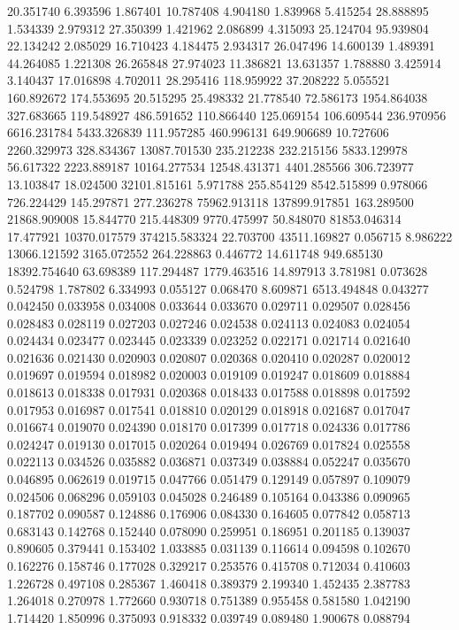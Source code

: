 20.351740
6.393596
1.867401
10.787408
4.904180
1.839968
5.415254
28.888895
1.534339
2.979312
27.350399
1.421962
2.086899
4.315093
25.124704
95.939804
22.134242
2.085029
16.710423
4.184475
2.934317
26.047496
14.600139
1.489391
44.264085
1.221308
26.265848
27.974023
11.386821
13.631357
1.788880
3.425914
3.140437
17.016898
4.702011
28.295416
118.959922
37.208222
5.055521
160.892672
174.553695
20.515295
25.498332
21.778540
72.586173
1954.864038
327.683665
119.548927
486.591652
110.866440
125.069154
106.609544
236.970956
6616.231784
5433.326839
111.957285
460.996131
649.906689
10.727606
2260.329973
328.834367
13087.701530
235.212238
232.215156
5833.129978
56.617322
2223.889187
10164.277534
12548.431371
4401.285566
306.723977
13.103847
18.024500
32101.815161
5.971788
255.854129
8542.515899
0.978066
726.224429
145.297871
277.236278
75962.913118
137899.917851
163.289500
21868.909008
15.844770
215.448309
9770.475997
50.848070
81853.046314
17.477921
10370.017579
374215.583324
22.703700
43511.169827
0.056715
8.986222
13066.121592
3165.072552
264.228863
0.446772
14.611748
949.685130
18392.754640
63.698389
117.294487
1779.463516
14.897913
3.781981
0.073628
0.524798
1.787802
6.334993
0.055127
0.068470
8.609871
6513.494848
0.043277
0.042450
0.033958
0.034008
0.033644
0.033670
0.029711
0.029507
0.028456
0.028483
0.028119
0.027203
0.027246
0.024538
0.024113
0.024083
0.024054
0.024434
0.023477
0.023445
0.023339
0.023252
0.022171
0.021714
0.021640
0.021636
0.021430
0.020903
0.020807
0.020368
0.020410
0.020287
0.020012
0.019697
0.019594
0.018982
0.020003
0.019109
0.019247
0.018609
0.018884
0.018613
0.018338
0.017931
0.020368
0.018433
0.017588
0.018898
0.017592
0.017953
0.016987
0.017541
0.018810
0.020129
0.018918
0.021687
0.017047
0.016674
0.019070
0.024390
0.018170
0.017399
0.017718
0.024336
0.017786
0.024247
0.019130
0.017015
0.020264
0.019494
0.026769
0.017824
0.025558
0.022113
0.034526
0.035882
0.036871
0.037349
0.038884
0.052247
0.035670
0.046895
0.062619
0.019715
0.047766
0.051479
0.129149
0.057897
0.109079
0.024506
0.068296
0.059103
0.045028
0.246489
0.105164
0.043386
0.090965
0.187702
0.090587
0.124886
0.176906
0.084330
0.164605
0.077842
0.058713
0.683143
0.142768
0.152440
0.078090
0.259951
0.186951
0.201185
0.139037
0.890605
0.379441
0.153402
1.033885
0.031139
0.116614
0.094598
0.102670
0.162276
0.158746
0.177028
0.329217
0.253576
0.415708
0.712034
0.410603
1.226728
0.497108
0.285367
1.460418
0.389379
2.199340
1.452435
2.387783
1.264018
0.270978
1.772660
0.930718
0.751389
0.955458
0.581580
1.042190
1.714420
1.850996
0.375093
0.918332
0.039749
0.089480
1.900678
0.088794
